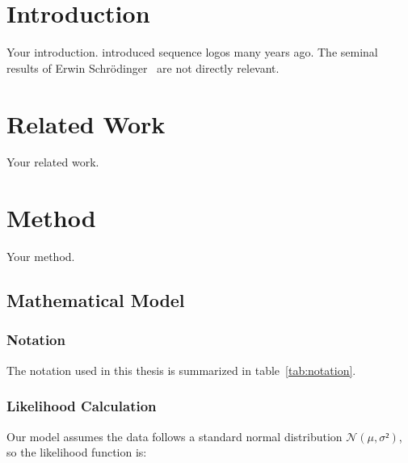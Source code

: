 \documentclass[BibLaTeXsortingNone]{PHlab-thesis}
\begin{document}





\newpage
\setcounter{page}{1}


\chapter{Introduction}
Your introduction.
\textcite{SS90} introduced sequence logos many years ago.
The seminal results of Erwin Schrödinger~\cite{Sch26} are not directly relevant.


\chapter{Related Work}
Your related work.


\chapter{Method}
Your method.


\section{Mathematical Model}
\subsection{Notation}
The notation used in this thesis is summarized in table~\ref{tab:notation}.

\subsection{Likelihood Calculation}
Our model assumes the data follows a standard normal distribution $𝒩(μ,σ²)$, so the likelihood function is:
\end{document}
